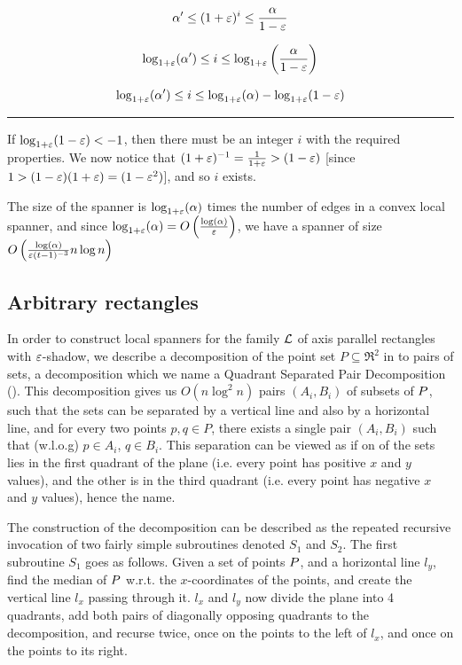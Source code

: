 \documentclass[12pt]{article}%
\begin{document}
\begin{equation}
    \alpha' \leq (1+\varepsilon)^i \leq \frac{\alpha}{1-\varepsilon}
\end{equation}

\begin{equation}
    \log_{1+\varepsilon}(\alpha') \leq i \leq
    \log_{1+\varepsilon}\left(\frac{\alpha}{1-\varepsilon}\right)
\end{equation}

\begin{equation}
    \log_{1+\varepsilon}(\alpha') \leq i \leq \log_{1+\varepsilon}(\alpha) -
    \log_{1+\varepsilon}(1-\varepsilon)
\end{equation}

\hrule

If $\log_{1+\varepsilon}(1-\varepsilon)<-1$, then there must be an integer $i$ with
the required properties. We now notice that
$(1+\varepsilon)^{-1}=\frac{1}{1+\varepsilon}>(1-\varepsilon)$ [since
$1>(1-\varepsilon)(1+\varepsilon)=(1-\varepsilon^2)$], and so $i$ exists.

The size of the spanner is $\log_{1+\varepsilon}(\alpha)$ times the number of
edges in a convex local spanner, and since
$\log_{1+\varepsilon}(\alpha)=O\left(\frac{\log(\alpha)}{\varepsilon}\right)$, we
have a spanner of size
$O\left(\frac{\log(\alpha)}{\varepsilon (t-1)^{-3}}n\log n\right)$


\subsection{Arbitrary rectangles}

In order to construct local spanners for the family $\mathcal{L}$ of axis
parallel rectangles with $\varepsilon$-shadow, we describe a decomposition of
the point set $P\subseteq \Re^2$ in to pairs of sets, a decomposition
which we name a Quadrant Separated Pair Decomposition (\QSPD). This
decomposition gives us $O(n\log^2n)$ pairs $(A_i,B_i)$ of subsets of
$P$, such that the sets can be separated by a vertical line and also
by a horizontal line, and for every two points $p,q\in P$, there
exists a single pair $(A_i,B_i)$ such that (w.l.o.g) $p\in A_i$,
$q\in B_i$. This separation can be viewed as if on of the sets lies in
the first quadrant of the plane (i.e. every point has positive $x$ and
$y$ values), and the other is in the third quadrant (i.e. every point
has negative $x$ and $y$ values), hence the name.

The construction of the decomposition can be described as the repeated
recursive invocation of two fairly simple subroutines denoted $S_1$
and $S_2$. The first subroutine $S_1$ goes as follows. Given a set of
points $P$, and a horizontal line $l_y$, find the median of $P$
w.r.t. the $x$-coordinates of the points, and create the vertical line
$l_x$ passing through it. $l_x$ and $l_y$ now divide the plane into 4
quadrants, add both pairs of diagonally opposing quadrants to the
decomposition, and recurse twice, once on the points to the left of
$l_x$, and once on the points to its right.
\end{document}

